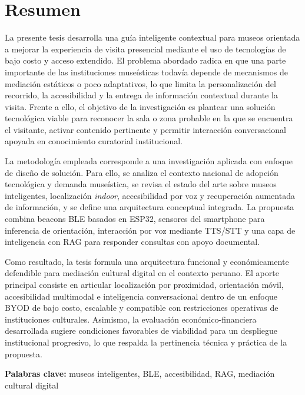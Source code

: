 \chapter*{Resumen}

La presente tesis desarrolla una guía inteligente contextual para museos orientada a mejorar la experiencia de visita presencial mediante el uso de tecnologías de bajo costo y acceso extendido. El problema abordado radica en que una parte importante de las instituciones museísticas todavía depende de mecanismos de mediación estáticos o poco adaptativos, lo que limita la personalización del recorrido, la accesibilidad y la entrega de información contextual durante la visita. Frente a ello, el objetivo de la investigación es plantear una solución tecnológica viable para reconocer la sala o zona probable en la que se encuentra el visitante, activar contenido pertinente y permitir interacción conversacional apoyada en conocimiento curatorial institucional.

La metodología empleada corresponde a una investigación aplicada con enfoque de diseño de solución. Para ello, se analiza el contexto nacional de adopción tecnológica y demanda museística, se revisa el estado del arte sobre museos inteligentes, localización \textit{indoor}, accesibilidad por voz y recuperación aumentada de información, y se define una arquitectura conceptual integrada. La propuesta combina beacons BLE basados en ESP32, sensores del smartphone para inferencia de orientación, interacción por voz mediante TTS/STT y una capa de inteligencia con RAG para responder consultas con apoyo documental.

Como resultado, la tesis formula una arquitectura funcional y económicamente defendible para mediación cultural digital en el contexto peruano. El aporte principal consiste en articular localización por proximidad, orientación móvil, accesibilidad multimodal e inteligencia conversacional dentro de un enfoque BYOD de bajo costo, escalable y compatible con restricciones operativas de instituciones culturales. Asimismo, la evaluación económico-financiera desarrollada sugiere condiciones favorables de viabilidad para un despliegue institucional progresivo, lo que respalda la pertinencia técnica y práctica de la propuesta.

\noindent\textbf{Palabras clave:} museos inteligentes, BLE, accesibilidad, RAG, mediación cultural digital

